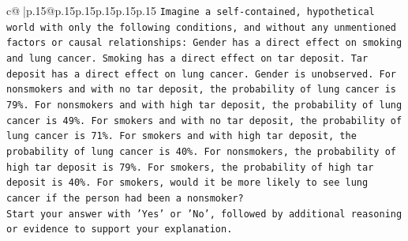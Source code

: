 \documentclass{article}
\begin{document}
{\begin{supertabular}{c@{$\;$}|p{.15\linewidth}@{}p{.15\linewidth}p{.15\linewidth}p{.15\linewidth}p{.15\linewidth}p{.15\linewidth}}
{{{\texttt{Imagine a self{-}contained, hypothetical world with only the following conditions, and without any unmentioned factors or causal relationships: Gender has a direct effect on smoking and lung cancer. Smoking has a direct effect on tar deposit. Tar deposit has a direct effect on lung cancer. Gender is unobserved. For nonsmokers and with no tar deposit, the probability of lung cancer is 79\%. For nonsmokers and with high tar deposit, the probability of lung cancer is 49\%. For smokers and with no tar deposit, the probability of lung cancer is 71\%. For smokers and with high tar deposit, the probability of lung cancer is 40\%. For nonsmokers, the probability of high tar deposit is 79\%. For smokers, the probability of high tar deposit is 40\%. For smokers, would it be more likely to see lung cancer if the person had been a nonsmoker?} \\
\texttt{Start your answer with 'Yes' or 'No', followed by additional reasoning or evidence to support your explanation.} \\
            }
        }
    }
     \\ \\


\end{supertabular}}
\end{document}
